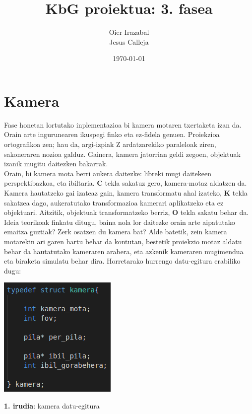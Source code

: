 \documentclass[12pt]{article}
\title{KbG proiektua: 3. fasea}
\author{
        Oier Irazabal\\
        Jesus Calleja
}
\date{\today}
\newcommand{\tekla}[1] {\textbf{#1}}
\begin{document}
\maketitle


\tableofcontents

\vspace{2cm}
\begin{center}
\end{center}

\pagebreak

\section{Kamera}

Fase honetan lortutako inplementazioa bi kamera motaren txertaketa izan da. Orain arte ingurunearen ikuspegi finko eta ez-fidela genuen. Proiekzioa ortografikoa zen; hau da, argi-izpiak Z ardatzarekiko paraleloak ziren, sakoneraren nozioa galduz. Gainera, kamera jatorrian geldi zegoen, objektuak izanik mugitu daitezken bakarrak.\\

Orain, bi kamera mota berri aukera daitezke: libreki mugi daitekeen perspektibazkoa, eta ibiltaria. \tekla{C} tekla sakatuz gero, kamera-motaz aldatzen da. Kamera hautatzeko gai izateaz gain, kamera transformatu ahal izateko, \tekla{K} tekla sakatzea dago, aukeratutako transformazioa kamerari aplikatzeko eta ez objektuari. Aitzitik, objektuak transformatzeko berriz, \tekla{O} tekla sakatu behar da.\\

Ideia teorikoak finkatu ditugu, baina nola lor daitezke orain arte aipatutako emaitza guztiak? Zerk osatzen du kamera bat?
Alde batetik, zein kamera motarekin ari garen hartu behar da kontutan, bestetik proiekzio motaz aldatu behar da hautatutako kameraren arabera, eta azkenik kameraren mugimendua eta biraketa simulatu behar dira. Horretarako hurrengo datu-egitura erabiliko dugu:

\begin{center}
\includegraphics[scale=0.7]{kamera_struct.png}

\textbf{1. irudia}: kamera datu-egitura
\end{center}
\end{document}

